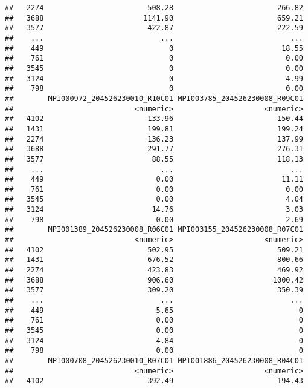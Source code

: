 \documentclass[
]{article}
\begin{document}
\begin{verbatim}
##   2274                        508.28                        266.82
##   3688                       1141.90                        659.21
##   3577                        422.87                        222.59
##    ...                           ...                           ...
##    449                             0                         18.55
##    761                             0                          0.00
##   3545                             0                          0.00
##   3124                             0                          4.99
##    798                             0                          0.00
##        MPI000972_204526230010_R10C01 MPI003785_204526230008_R09C01
##                            <numeric>                     <numeric>
##   4102                        133.96                        150.44
##   1431                        199.81                        199.24
##   2274                        136.23                        137.99
##   3688                        291.77                        276.31
##   3577                         88.55                        118.13
##    ...                           ...                           ...
##    449                          0.00                         11.11
##    761                          0.00                          0.00
##   3545                          0.00                          4.04
##   3124                         14.76                          3.03
##    798                          0.00                          2.69
##        MPI001389_204526230008_R06C01 MPI003155_204526230008_R07C01
##                            <numeric>                     <numeric>
##   4102                        502.95                        509.21
##   1431                        676.52                        800.66
##   2274                        423.83                        469.92
##   3688                        906.60                       1000.42
##   3577                        309.20                        350.39
##    ...                           ...                           ...
##    449                          5.65                             0
##    761                          0.00                             0
##   3545                          0.00                             0
##   3124                          4.84                             0
##    798                          0.00                             0
##        MPI000708_204526230010_R07C01 MPI001886_204526230008_R04C01
##                            <numeric>                     <numeric>
##   4102                        392.49                        194.43

\end{verbatim}
\end{document}
